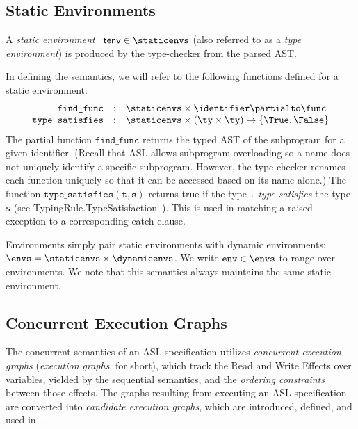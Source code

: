 \documentclass{book}
\newcommand\tenv[0]{\textsf{tenv}}
\newcommand\findfunc[0]{\texttt{find\_func}}
\newcommand\typesatisfies[0]{\texttt{type\_satisfies}}
\newcommand\env[0]{\texttt{env}}
\begin{document}
\subsection{Static Environments \label{sec:staticenvironments}}

A \emph{static environment}~\cite{ASLTypingReference} $\tenv \in \staticenvs$ (also referred to as a \emph{type environment})
is produced by the type-checker from the parsed AST.

In defining the semantics, we will refer to the following functions defined for a static environment:
\[
  \begin{array}{rcl}
    \findfunc       &:& \staticenvs \times \identifier \partialto \func\\
    \typesatisfies  &:& \staticenvs \times (\ty \times \ty) \rightarrow \{\True, \False\}
  \end{array}
\]
The partial function $\findfunc$ returns the typed AST of the subprogram for a given identifier.
(Recall that ASL allows subprogram overloading so a name does not uniquely identify
a specific subprogram.
However, the type-checker renames each function uniquely so that it can be accessed based
on its name alone.)
%
The function $\typesatisfies(\texttt{t}, \texttt{s})$ returns true
if the type \texttt{t} \emph{type-satisfies} the type \texttt{s}
(see TypingRule.TypeSatisfaction~\cite{ASLTypingReference}).
This is used in matching a raised exception to a corresponding catch clause.

Environments simply pair static environments with dynamic environments:
$\envs = \staticenvs \times \dynamicenvs$. We write $\env \in \envs$ to range over environments.
%
We note that this semantics always maintains the same static environment.

\subsection{Concurrent Execution Graphs \label{sec:concurrentexecutiongraphs}}

The concurrent semantics of an ASL specification utilizes \emph{concurrent execution graphs}
(\emph{execution graphs}, for short),
which track the Read and Write Effects over variables, yielded by the sequential semantics,
and the \emph{ordering constraints} between those effects.
The graphs resulting from executing an ASL specification are converted into
\emph{candidate execution graphs}, which are introduced, defined,
and used in~\cite{AlglaveMT14,alglave2016syntax,AlglaveDGHM21}.
\end{document}
